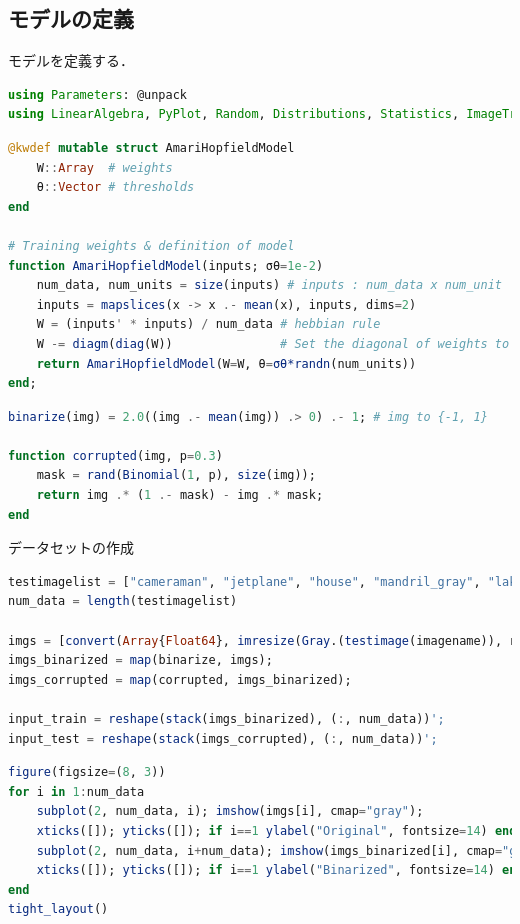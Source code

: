 \subsection{モデルの定義}
モデルを定義する．
\begin{lstlisting}[language=julia]
using Parameters: @unpack
using LinearAlgebra, PyPlot, Random, Distributions, Statistics, ImageTransformations, TestImages, ColorTypes
\end{lstlisting}
\begin{lstlisting}[language=julia]
@kwdef mutable struct AmariHopfieldModel
    W::Array  # weights
    θ::Vector # thresholds
end

# Training weights & definition of model
function AmariHopfieldModel(inputs; σθ=1e-2)
    num_data, num_units = size(inputs) # inputs : num_data x num_unit
    inputs = mapslices(x -> x .- mean(x), inputs, dims=2)  
    W = (inputs' * inputs) / num_data # hebbian rule
    W -= diagm(diag(W))               # Set the diagonal of weights to zero
    return AmariHopfieldModel(W=W, θ=σθ*randn(num_units))
end;
\end{lstlisting}
\begin{lstlisting}[language=julia]
binarize(img) = 2.0((img .- mean(img)) .> 0) .- 1; # img to {-1, 1}

function corrupted(img, p=0.3)
    mask = rand(Binomial(1, p), size(img));
    return img .* (1 .- mask) - img .* mask; 
end
\end{lstlisting}
データセットの作成
\begin{lstlisting}[language=julia]
testimagelist = ["cameraman", "jetplane", "house", "mandril_gray", "lake_gray"]; # gray & size(512 x 512)
num_data = length(testimagelist)

imgs = [convert(Array{Float64}, imresize(Gray.(testimage(imagename)), ratio=1/8)) for imagename in testimagelist];
imgs_binarized = map(binarize, imgs);
imgs_corrupted = map(corrupted, imgs_binarized);

input_train = reshape(stack(imgs_binarized), (:, num_data))';
input_test = reshape(stack(imgs_corrupted), (:, num_data))';
\end{lstlisting}
\begin{lstlisting}[language=julia]
figure(figsize=(8, 3))
for i in 1:num_data
    subplot(2, num_data, i); imshow(imgs[i], cmap="gray"); 
    xticks([]); yticks([]); if i==1 ylabel("Original", fontsize=14) end;
    subplot(2, num_data, i+num_data); imshow(imgs_binarized[i], cmap="gray"); 
    xticks([]); yticks([]); if i==1 ylabel("Binarized", fontsize=14) end;
end
tight_layout()
\end{lstlisting}
